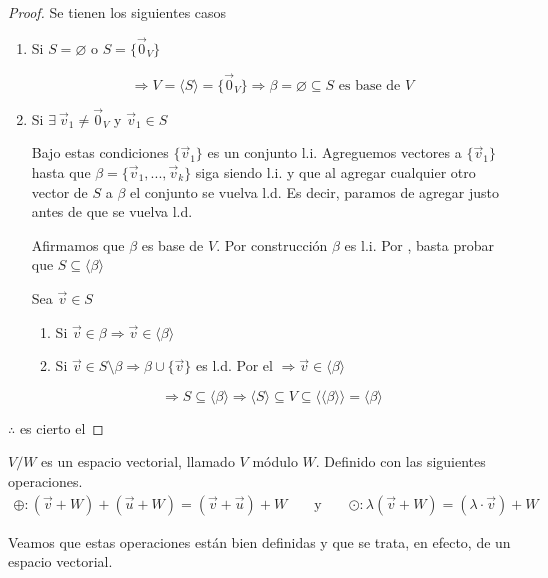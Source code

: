 \begin{proof}
    Se tienen los siguientes casos

    \begin{enumerate}
        \item Si $S=\varnothing$ o $S = \{ {\vec{0}}_{V}\}$

        \begin{equation*}
            \Rightarrow V = \langle S \rangle =  \{ {\vec{0}}_{V}\} \Rightarrow \beta = \varnothing \subseteq S \text{ es base de } V
        \end{equation*}
        \item Si $\exists \: {\vec{v}}_{1} \neq {\vec{0}}_{V}$ y ${\vec{v}}_{1} \in S$

        Bajo estas condiciones $\{{\vec{v}}_{1}\}$ es un conjunto l.i. Agreguemos vectores a $\{{\vec{v}}_{1}\}$ hasta que $\beta = \{ {\vec{v}}_{1}, ..., {\vec{v}}_{k} \} $ siga siendo l.i. y que al agregar cualquier otro vector de $S$ a $\beta$ el conjunto se vuelva l.d. Es decir, paramos de agregar justo antes de que se vuelva l.d.
        
        Afirmamos que $\beta$ es base de $V$. Por construcción $\beta$ es l.i. Por , basta probar que $S \subseteq \langle \beta \rangle$

        Sea $\vec{v} \in S$

        \begin{enumerate}
            \item Si $\vec{v} \in \beta \Rightarrow \vec{v} \in \langle \beta \rangle$
            \item Si $\vec{v} \in S \setminus \beta \Rightarrow \beta \cup \{ \vec{v} \}$ es l.d. Por el  $\Rightarrow \vec{v} \in \langle \beta \rangle$
        \end{enumerate}
        \begin{equation*}
            \Rightarrow S \subseteq  \langle \beta \rangle \Rightarrow \langle S \rangle \subseteq V \subseteq \langle \langle \beta \rangle \rangle = \langle \beta \rangle
        \end{equation*}
    \end{enumerate}
    $\therefore$ es cierto el 
\end{proof}

\begin{eg}
    $V / W$ es un espacio vectorial, llamado $V$ módulo $W$. Definido con las siguientes operaciones.
\begin{align*}
    \oplus : ( \vec{v} + W ) + ( \vec{u} + W ) = ( \vec{v} + \vec{u} ) + W  && \text{ y } && \odot : \lambda(\vec{v}+W)= (\lambda \cdot \vec{v}) +W
\end{align*}

Veamos que estas operaciones están bien definidas y que se trata, en efecto, de un espacio vectorial. 
\end{eg}

